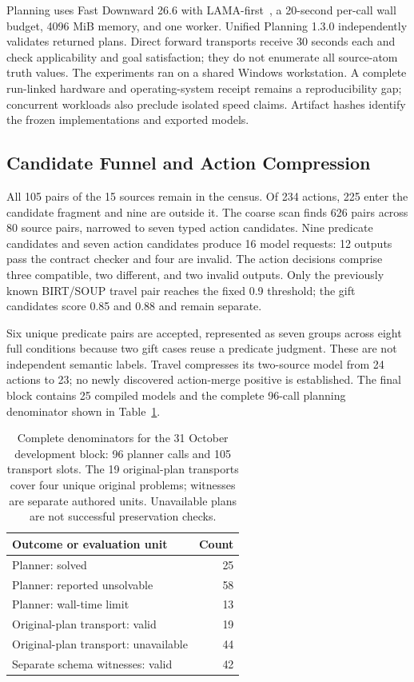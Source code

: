 Planning uses Fast Downward 26.6 with LAMA-first~\cite{helmert2006downward}, a 20-second per-call wall budget, 4096 MiB memory, and one worker. Unified Planning 1.3.0 independently validates returned plans. Direct forward transports receive 30 seconds each and check applicability and goal satisfaction; they do not enumerate all source-atom truth values. The experiments ran on a shared Windows workstation. A complete run-linked hardware and operating-system receipt remains a reproducibility gap; concurrent workloads also preclude isolated speed claims. Artifact hashes identify the frozen implementations and exported models.

\subsection{Candidate Funnel and Action Compression}
All 105 pairs of the 15 sources remain in the census. Of 234 actions, 225 enter the candidate fragment and nine are outside it. The coarse scan finds 626 pairs across 80 source pairs, narrowed to seven typed action candidates. Nine predicate candidates and seven action candidates produce 16 model requests: 12 outputs pass the contract checker and four are invalid. The action decisions comprise three compatible, two different, and two invalid outputs. Only the previously known BIRT/SOUP travel pair reaches the fixed 0.9 threshold; the gift candidates score 0.85 and 0.88 and remain separate.

Six unique predicate pairs are accepted, represented as seven groups across eight full conditions because two gift cases reuse a predicate judgment. These are not independent semantic labels. Travel compresses its two-source model from 24 actions to 23; no newly discovered action-merge positive is established. The final block contains 25 compiled models and the complete 96-call planning denominator shown in Table~\ref{tab:story-summary}.

\begin{table}[t]
\centering
\begin{tabular}{lr}
\toprule
Outcome or evaluation unit & Count\\
\midrule
Planner: solved & 25\\
Planner: reported unsolvable & 58\\
Planner: wall-time limit & 13\\
\midrule
Original-plan transport: valid & 19\\
Original-plan transport: unavailable & 44\\
Separate schema witnesses: valid & 42\\
\bottomrule
\end{tabular}
\caption{Complete denominators for the 31 October development block: 96 planner calls and 105 transport slots. The 19 original-plan transports cover four unique original problems; witnesses are separate authored units. Unavailable plans are not successful preservation checks.}
\label{tab:story-summary}
\end{table}

